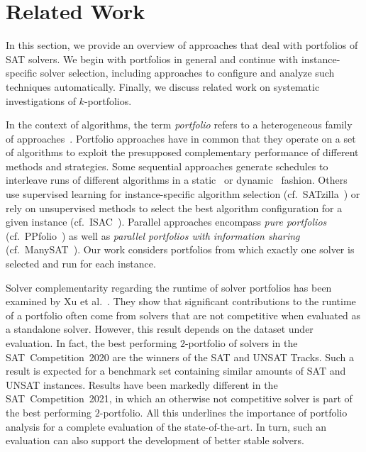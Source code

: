 \documentclass[a4paper,USenglish,pdfa]{lipics-v2021} %
\begin{document}
\section{Related Work}
\label{sec:related-work}

In this section, we provide an overview of approaches that deal with portfolios of SAT solvers. 
We begin with portfolios in general and continue with instance-specific solver selection, including approaches to configure and analyze such techniques automatically. 
Finally, we discuss related work on systematic investigations of $k$-portfolios.

In the context of algorithms, the term \emph{portfolio} refers to a heterogeneous family of approaches~\cite{kerschke2019automated}. 
Portfolio approaches have in common that they operate on a set of algorithms to exploit the presupposed complementary performance of different methods and strategies. 
Some sequential approaches generate schedules to interleave runs of different algorithms in a static~\cite{Gomes:2001:AlgoSched} or dynamic~\cite{Carchrae:2005:AlgoSched,Streeter:2007:AlgoSched} fashion. 
Others use supervised learning for instance-specific algorithm selection (cf.~SATzilla~\cite{xu2008satzilla}) or rely on unsupervised methods to select the best algorithm configuration for a given instance (cf.~ISAC~\cite{Kadioglu:2010:ISAC}).
Parallel approaches encompass \emph{pure portfolios} (cf.~PPfolio~\cite{Roussel:2012:ppfolio}) as well as \emph{parallel portfolios with information sharing} (cf.~ManySAT~\cite{Hamadi:2009:ManySAT}).
Our work considers portfolios from which exactly one solver is selected and run for each instance.

Solver complementarity regarding the runtime of solver portfolios has been examined by Xu et al.~\cite{Xu:2012:EvalContribVBS}. 
They show that significant contributions to the runtime of a portfolio often come from solvers that are not competitive when evaluated as a standalone solver. 
However, this result depends on the dataset under evaluation. 
In fact, the best performing $2$-portfolio of solvers in the SAT~Competition~2020 are the winners of the SAT and UNSAT Tracks.
Such a result is expected for a benchmark set containing similar amounts of SAT and UNSAT instances. 
Results have been markedly different in the SAT~Competition~2021, in which an otherwise not competitive solver is part of the best performing $2$-portfolio. 
All this underlines the importance of portfolio analysis for a complete evaluation of the state-of-the-art. 
In turn, such an evaluation can also support the development of better stable solvers.
\end{document}
